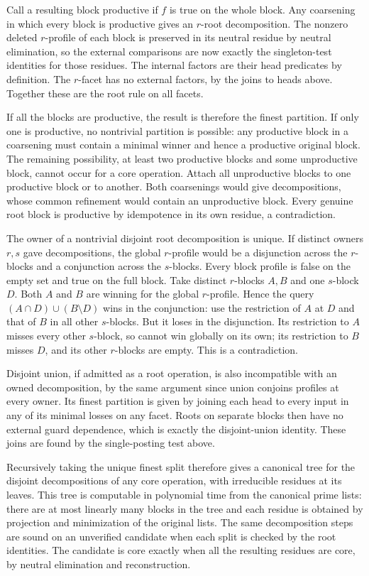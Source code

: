 Call a resulting block productive if $f$ is true
on the whole block. Any coarsening in which every
block is productive gives an $r$-root decomposition.
The nonzero deleted $r$-profile of each block is
preserved in its neutral residue by neutral
elimination, so the external comparisons are now
exactly the singleton-test identities for those
residues. The internal factors are their head
predicates by definition. The $r$-facet has no
external factors, by the joins to heads above.
Together these are the root rule on all facets.

If all the blocks are productive, the result is
therefore the finest partition. If only one is
productive, no nontrivial partition is possible:
any productive block in a coarsening must contain
a minimal winner and hence a productive original
block. The remaining possibility, at least two
productive blocks and some unproductive block,
cannot occur for a core operation. Attach all
unproductive blocks to one productive block or to
another. Both coarsenings would give decompositions,
whose common refinement would contain an unproductive
block. Every genuine root block is productive by
idempotence in its own residue, a contradiction.

The owner of a nontrivial disjoint root decomposition
is unique. If distinct owners $r,s$ gave decompositions,
the global $r$-profile would be a disjunction across
the $r$-blocks and a conjunction across the $s$-blocks.
Every block profile is false on the empty set and true
on the full block. Take distinct $r$-blocks $A,B$ and
one $s$-block $D$. Both $A$ and $B$ are winning for
the global $r$-profile. Hence the query
$(A\cap D)\cup(B\setminus D)$ wins in the conjunction:
use the restriction of $A$ at $D$ and that of $B$
in all other $s$-blocks. But it loses in the
disjunction. Its restriction to $A$ misses every
other $s$-block, so cannot win globally on its own;
its restriction to $B$ misses $D$, and its other
$r$-blocks are empty. This is a contradiction.

Disjoint union, if admitted as a root operation,
is also incompatible with an owned decomposition,
by the same argument since union conjoins profiles
at every owner. Its finest partition is given by
joining each head to every input in any of its
minimal losses on any facet. Roots on separate
blocks then have no external guard dependence, which
is exactly the disjoint-union identity. These joins
are found by the single-posting test above.

Recursively taking the unique finest split therefore
gives a canonical tree for the disjoint decompositions
of any core operation, with irreducible residues at
its leaves. This tree is computable in polynomial
time from the canonical prime lists: there are at
most linearly many blocks in the tree and each
residue is obtained by projection and minimization
of the original lists. The same decomposition steps
are sound on an unverified candidate when each split
is checked by the root identities. The candidate is
core exactly when all the resulting residues are
core, by neutral elimination and reconstruction.


